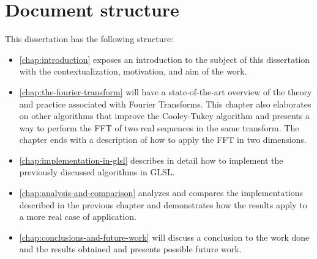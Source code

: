 \documentclass[
  oneside,
  11pt, a4paper,
  footinclude=true,
  headinclude=true,
  cleardoublepage=empty
]{scrbook}
\begin{document}
\section{Document structure} \label{sec:document-structure}

This dissertation has the following structure:

\begin{itemize}
    \item \autoref{chap:introduction} exposes an introduction to the subject of this dissertation with the contextualization, motivation, and aim of the work.
    \item \autoref{chap:the-fourier-transform} will have a state-of-the-art overview of the theory and practice associated with Fourier Transforms. This chapter also elaborates on other algorithms that improve the Cooley-Tukey algorithm and presents a way to perform the FFT of two real sequences in the same transform. The chapter ends with a description of how to apply the FFT in two dimensions. 
    \item \autoref{chap:implementation-in-glsl} describes in detail how to implement the previously discussed algorithms in GLSL.
    \item \autoref{chap:analysis-and-comparison} analyzes and compares the implementations described in the previous chapter and demonstrates how the results apply to a more real case of application.
    \item \autoref{chap:conclusions-and-future-work} will discuss a conclusion to the work done and the results obtained and presents possible future work.
\end{itemize}





\end{document}
